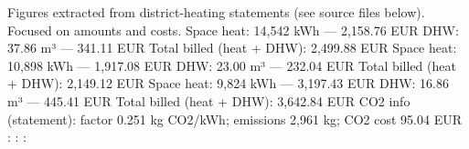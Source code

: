 \markdownRendererDocumentBegin
Figures extracted from district‑heating statements (see source files below). Focused on amounts and costs.\markdownRendererInterblockSeparator
{}\markdownRendererSectionBegin
\markdownRendererSectionBegin
{}\markdownRendererInterblockSeparator
{}\markdownRendererUlBeginTight
{}\markdownRendererUlItemEnd 
\markdownRendererUlItem Space heat: 14,542 kWh — 2,158.76 EUR\markdownRendererUlItemEnd 
\markdownRendererUlItem DHW: 37.86 m³ — 341.11 EUR\markdownRendererUlItemEnd 
\markdownRendererUlItem Total billed (heat + DHW): 2,499.88 EUR\markdownRendererUlItemEnd 
{}\markdownRendererUlItemEnd 
\markdownRendererUlItem Space heat: 10,898 kWh — 1,917.08 EUR\markdownRendererUlItemEnd 
\markdownRendererUlItem DHW: 23.00 m³ — 232.04 EUR\markdownRendererUlItemEnd 
\markdownRendererUlItem Total billed (heat + DHW): 2,149.12 EUR\markdownRendererUlItemEnd 
{}\markdownRendererUlItemEnd 
\markdownRendererUlItem Space heat: 9,824 kWh — 3,197.43 EUR\markdownRendererUlItemEnd 
\markdownRendererUlItem DHW: 16.86 m³ — 445.41 EUR\markdownRendererUlItemEnd 
\markdownRendererUlItem Total billed (heat + DHW): 3,642.84 EUR\markdownRendererUlItemEnd 
\markdownRendererUlItem CO2 info (statement): factor 0.251 kg CO2/kWh; emissions 2,961 kg; CO2 cost 95.04 EUR\markdownRendererUlItemEnd 
\markdownRendererUlEndTight \markdownRendererInterblockSeparator
{}
\markdownRendererSectionEnd \markdownRendererSectionBegin
{}\markdownRendererInterblockSeparator
{}\markdownRendererUlBeginTight
{}: \markdownRendererUlItemEnd 
{}: \markdownRendererUlItemEnd 
{}: \markdownRendererUlItemEnd 
\markdownRendererUlEndTight 
\markdownRendererSectionEnd 
\markdownRendererSectionEnd \markdownRendererDocumentEnd